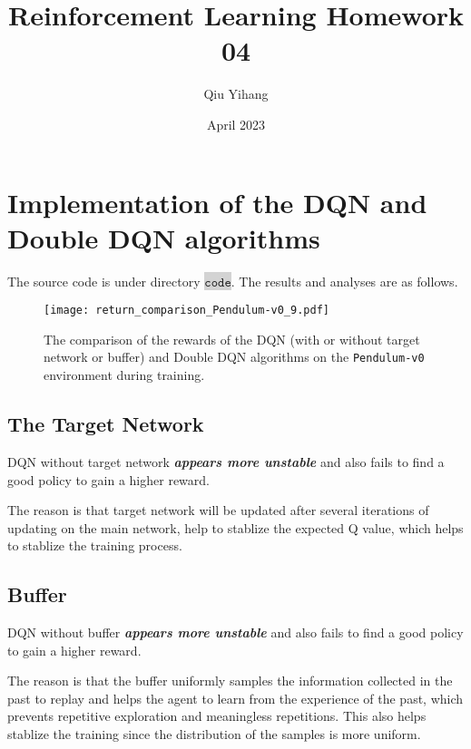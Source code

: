 \documentclass{article}
\title{\textbf{Reinforcement Learning Homework 04}}
\author{Qiu Yihang}
\date{April 2023}
\begin{document}
\maketitle

\vspace{1em}
\section{Implementation of the DQN and Double DQN algorithms}
\vspace{1em}
The source code is under directory \colorbox{lightgray}{$\mathtt{code}$}. The results and analyses are as follows.

\vspace{-1em}
\begin{figure}[htbp]
    \centering
    \texttt{[image: return\_comparison\_Pendulum-v0\_9.pdf]}
    \caption{The comparison of the rewards of the DQN (with or without target network or buffer) and Double DQN algorithms on the \texttt{Pendulum-v0} environment during training.}
\end{figure}

\subsection{The Target Network}

\hspace{1.2em}
DQN without target network \textbf{\emph{appears more unstable}} and also fails to find a good policy to gain a higher reward. 

The reason is that target network will be updated after several iterations of updating on the main network, help to stablize the expected Q value, which helps to stablize the training process.

\subsection{Buffer}

\hspace{1.2em}
DQN without buffer \textbf{\emph{appears more unstable}} and also fails to find a good policy to gain a higher reward.

The reason is that the buffer uniformly samples the information collected in the past to replay and helps the agent to learn from the experience of the past, which prevents repetitive exploration and meaningless repetitions. This also helps stablize the training since the distribution of the samples is more uniform.
\end{document}
